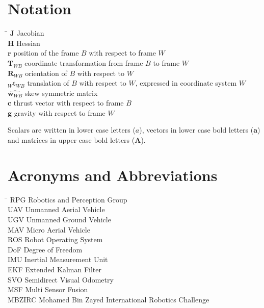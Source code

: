 \section*{Notation}
  \begin{tabbing}
    \hspace*{1.6cm}   \= \kill
    $\mathbf{J}$       \> Jacobian \\[0.5ex]
    $\mathbf{H}$       \> Hessian \\[0.5ex]
    $\boldsymbol{r}$  \> position of the frame $B$ with respect to frame $W$ \\[0.5ex]
    $\mathbf{T}_{WB}$  \> coordinate transformation from frame $B$ to frame $W$ \\[0.5ex]
    $\mathbf{R}_{WB}$  \> orientation of $B$ with respect to $W$ \\[0.5ex]
    $_W\mathbf{t}_{WB}$\> translation of $B$ with respect to $W$, expressed in coordinate system $W$ \\[0.5ex]
    $\hat{\boldsymbol{w}_{WB}}$ \> skew symmetric matrix \\[0.5ex]
    $\boldsymbol{c}$  \> thrust vector with respect to frame $B$ \\[0.5ex]
    $\boldsymbol{g}$  \> gravity with respect to frame $W$ \\[0.5ex]
  \end{tabbing}
  
Scalars are written in lower case letters ($a$), vectors in lower case bold letters ($\mathbf{a}$) and matrices in upper case bold letters ($\mathbf{A}$).

\section*{Acronyms and Abbreviations}
  \begin{tabbing}
    \hspace*{1.6cm}  \= \kill
    RPG     \> Robotics and Perception Group \\[0.5ex]
    UAV     \> Unmanned Aerial Vehicle \\[0.5ex]
    UGV     \> Unmanned Ground Vehicle \\[0.5ex]
    MAV     \> Micro Aerial Vehicle \\[0.5ex]
    ROS     \> Robot Operating System \\[0.5ex]
    DoF     \> Degree of Freedom \\[0.5ex]
    IMU     \> Inertial Measurement Unit \\[0.5ex]
    EKF   \> Extended Kalman Filter \\[0.5ex]
    SVO   \> Semidirect Visual Odometry \\[0.5ex]
    MSF   \> Multi Sensor Fusion \\[0.5ex]
    MBZIRC    \> Mohamed Bin Zayed International Robotics Challenge \\[0.5ex]
  \end{tabbing}

\clearpage

